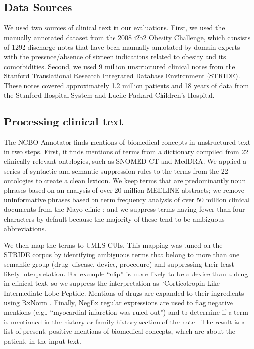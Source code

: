 \subsection{Data Sources}
We used two sources of clinical text in our evaluations.  First, we
used the manually annotated dataset from the 2008 i2b2 Obesity
Challenge, which consists of 1292 discharge notes that have been
manually annotated by domain experts with the presence/absence of
sixteen indications related to obesity and its comorbidities.  Second,
we used 9 million unstructured clinical notes from the Stanford
Translational Research Integrated Database Environment (STRIDE).
These notes covered approximately 1.2 million patients and 18 years of
data from the Stanford Hospital System and Lucile Packard Children’s
Hospital.

\subsection{Processing clinical text}
The NCBO Annotator finds mentions of biomedical concepts in
unstructured text in two steps.  First, it finds mentions of terms
from a dictionary compiled from 22 clinically relevant ontologies,
such as SNOMED-CT and MedDRA.  We applied a series of syntactic and
semantic suppression rules to the terms from the 22 ontologies to
create a clean lexicon. We keep terms that are predominantly noun
phrases \cite{Xu2010} based on an analysis of over 20 million MEDLINE
abstracts; we remove uninformative phrases based on term frequency
analysis of over 50 million clinical documents from the Mayo clinic
\cite{Wu2012}; and we suppress terms having fewer than four characters
by default because the majority of these tend to be ambiguous
abbreviations.

We then map the terms to UMLS CUIs.  This mapping was tuned on the
STRIDE corpus by identifying ambiguous terms that belong to more than
one semantic group (drug, disease, device, procedure)
\cite{Wu2012,Bodenreider2003} and suppressing their least likely
interpretation. For example “clip” is more likely to be a device than
a drug in clinical text, so we suppress the interpretation as
“Corticotropin-Like Intermediate Lobe Peptide.  Mentions of drugs are
expanded to their ingredients using RxNorm \cite{Nelson2011}.
Finally, NegEx regular expressions are used to flag negative mentions
(e.g., “myocardial infarction was ruled out”) and to determine if a
term is mentioned in the history or family history section of the note
\cite{Chapman2001}.  The result is a list of present, positive
mentions of biomedical concepts, which are about the patient, in the
input text.

